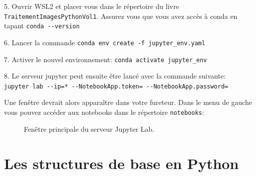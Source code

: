 \documentclass[
  11pt,
  letterpaper,
  open=any,
  twoside=false,
  french]{scrbook}
\begin{document}
5. Ouvrir WSL2 et placer vous dans le répertoire du livre
\texttt{TraitementImagesPythonVol1}. Assurez vous que vous avez accès à
conda en tapant \texttt{conda\ -\/-version}

6. Lancer la commande \texttt{conda\ env\ create\ -f\ jupyter\_env.yaml}

7. Activer le nouvel environnement:
\texttt{conda\ activate\ jupyter\_env}

8. Le serveur jupyter peut ensuite être lancé avec la commande suivante:
\texttt{jupyter\ lab\ -\/-ip=\textquotesingle{}*\textquotesingle{}\ -\/-NotebookApp.token=\textquotesingle{}\textquotesingle{}\ -\/-NotebookApp.password=\textquotesingle{}\textquotesingle{}}

Une fenêtre devrait alors apparaître dans votre fureteur. Dans le menu
de gauche vous pouvez accéder aux notebooks dans le répertoire
\texttt{notebooks}:

\begin{figure}


\caption[Client Jupyter Lab]{\label{fig-jupyterlab}Fenêtre principale du
serveur Jupyter Lab.}

\end{figure}%

\section{Les structures de base en
Python}\label{les-structures-de-base-en-python}
\end{document}
